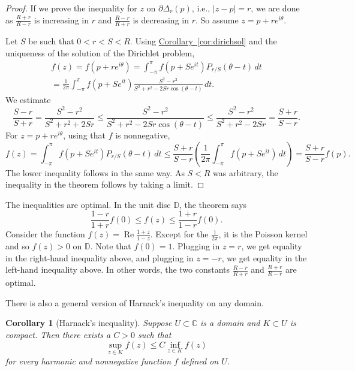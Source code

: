 \documentclass[12pt,openany]{book}
\renewcommand{\Re}{\operatorname{Re}}
\newcommand{\sabs}[1]{\lvert {#1} \rvert}
\newcommand{\C}{{\mathbb{C}}}
\newcommand{\D}{{\mathbb{D}}}
\theoremstyle{plain}
\newtheorem{cor}[thm]{Corollary}
\theoremstyle{remark}
\theoremstyle{definition}
\theoremstyle{exercise}
\theoremstyle{example}
\newcommand{\corref}[1]{\hyperref[#1]{Corollary~\ref*{#1}}}
\begin{document}
\begin{proof}
If we prove the inequality for $z$ on 
$\partial \Delta_r(p)$, i.e., $\sabs{z-p}=r$, we are done
as $\frac{R+r}{R-r}$ is increasing in $r$ and
$\frac{R-r}{R+r}$ is decreasing in $r$.  So 
assume $z = p+re^{i\theta}$.

Let $S$ be such that $0 < r < S < R$.
Using \corref{cor:dirichsol} and the uniqueness of the
solution of the
Dirichlet problem,
\begin{multline*}
f(z)
=
f(p + re^{i\theta})
=
\int_{-\pi}^\pi f(p+Se^{it}) P_{r/S}(\theta-t) \, dt
\\
=
\frac{1}{2\pi} 
\int_{-\pi}^\pi f(p+Se^{it})
\frac{S^2-r^2}{S^2+r^2-2Sr \cos (\theta-t)}
\, dt .
\end{multline*}
We estimate
\begin{equation*}
\frac{S-r}{S+r}
=
\frac{S^2-r^2}{S^2+r^2+2Sr}
\leq
\frac{S^2-r^2}{S^2+r^2-2Sr \cos (\theta-t)}
\leq
\frac{S^2-r^2}{S^2+r^2-2Sr}
=
\frac{S+r}{S-r} .
\end{equation*}
For $z = p+re^{i\theta}$,
using that $f$ is nonnegative,
\begin{equation*}
f(z)
=
\int_{-\pi}^\pi f(p+Se^{it}) P_{r/S}(\theta-t) \, dt
\leq
\frac{S+r}{S-r} 
\left(
\frac{1}{2\pi}
\int_{-\pi}^\pi f(p+Se^{it}) \, dt
\right)
=
\frac{S+r}{S-r} 
f(p) .
\end{equation*}
The lower inequality follows in the same way.
As $S<R$ was arbitrary, the inequality in the theorem 
follows by taking a limit.
\end{proof}

The inequalities are optimal.  In the unit disc $\D$, the theorem says
\begin{equation*}
\frac{1-r}{1+r} f(0) \leq f(z) \leq \frac{1+r}{1-r} f(0) .
\end{equation*}
Consider the function $f(z) = \Re \frac{1+z}{1-z}$.  Except for the
$\frac{1}{2\pi}$, it is the Poisson kernel and so 
$f(z) > 0$ on $\D$.  Note that $f(0)=1$.  Plugging in $z=r$, we get
equality in the right-hand inequality above, and plugging in $z=-r$,
we get equality in the left-hand inequality above.  In other words,
the two constants
$\frac{R-r}{R+r}$ and $\frac{R+r}{R-r}$ are optimal.

There is also a general version of Harnack's inequality on any domain.

\begin{cor}[Harnack's inequality]
Suppose $U \subset \C$ is a domain and $K \subset U$ is compact.
Then there exists a $C > 0$ such that
\begin{equation*}
\sup_{z \in K} f(z) \leq C \inf_{z\in K} f(z)
\end{equation*}
for every harmonic and nonnegative function $f$ defined on $U$.
\end{cor}
\end{document}
